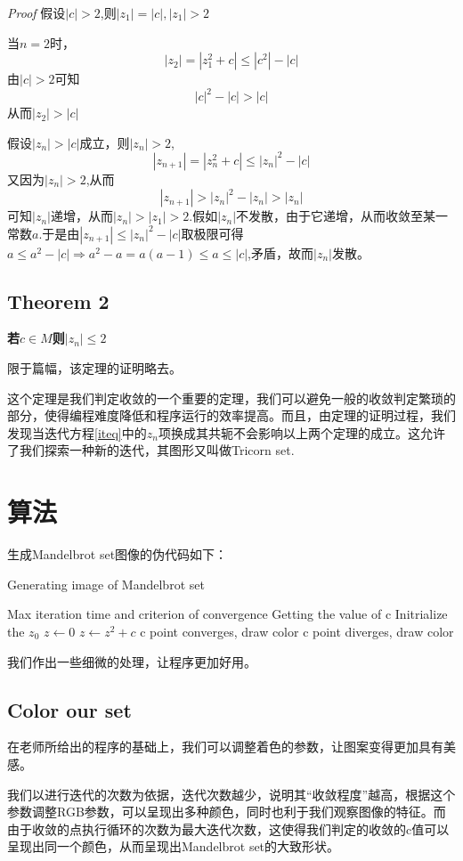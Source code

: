 \documentclass{ctexart}
\begin{document}
\textit{Proof}{}\cite{a} 假设$|c|>2$,则$|z_1|=|c|,|z_1|>2$\par
当$n=2$时，
$$|z_2|=|z_1^2+c|\le |c^2|-|c|$$
由$|c|>2$可知
$$|c|^2-|c|>|c|$$
从而$|z_2|>|c|$\par
假设$|z_n|>|c|$成立，则$|z_n|>2$,
$$|z_{n+1}|=|z_n^2+c|\le |z_n|^2-|c|$$
又因为$|z_n|>2$,从而
$$|z_{n+1}|>|z_n|^2-|z_n|>|z_n|$$
可知$|z_n|$递增，从而$|z_n|>|z_1|>2$.假如$|z_n|$不发散，由于它递增，从而收敛至某一常数$a$.于是由$|z_{n+1}|\le |z_n|^2-|c|$取极限可得$a\le a^2-|c|\Rightarrow a^2-a=a(a-1)\le a\le |c|$,矛盾，故而$|z_n|$发散。
\subsection{Theorem 2}
\textbf{若$c \in M$则$|z_n|\le 2$}\par
限于篇幅，该定理的证明略去。

这个定理是我们判定收敛的一个重要的定理，我们可以避免一般的收敛判定繁琐的部分，使得编程难度降低和程序运行的效率提高。而且，由定理的证明过程，我们发现当迭代方程\ref{iteq}中的$z_n$项换成其共轭不会影响以上两个定理的成立。这允许了我们探索一种新的迭代，其图形又叫做Tricorn set.
\section{算法}
生成Mandelbrot set图像的伪代码如下：
\begin{algorithm}
\caption{Generating image of Mandelbrot set}
\label{alg1}
\begin{algorithmic}
\Require Max iteration time and criterion of convergence
\State Getting the value of c
\State Initrialize the $z_0$ $z \gets 0$
\State $z \gets z^2 + c$
\EndWhile
{}
\State c point converges, draw color
\Else{} c point diverges, draw color
\EndIf
\end{algorithmic}
\end{algorithm}
我们作出一些细微的处理，让程序更加好用。
\subsection{Color our set}
在老师所给出的程序的基础上，我们可以调整着色的参数，让图案变得更加具有美感。

我们以进行迭代的次数为依据，迭代次数越少，说明其“收敛程度”越高，根据这个参数调整RGB参数，可以呈现出多种颜色，同时也利于我们观察图像的特征。而由于收敛的点执行循环的次数为最大迭代次数，这使得我们判定的收敛的c值可以呈现出同一个颜色，从而呈现出Mandelbrot set的大致形状。
\end{document}
